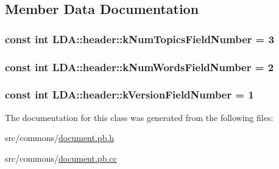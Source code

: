 \subsection{Member Data Documentation}
\hypertarget{class_l_d_a_1_1header_a3e4e67c2abbd89bf59dcb6a58a5e93f4}{
\subsubsection[{kNumTopicsFieldNumber}]{\setlength{\rightskip}{0pt plus 5cm}const int {\bf LDA::header::kNumTopicsFieldNumber} = 3}}
\label{class_l_d_a_1_1header_a3e4e67c2abbd89bf59dcb6a58a5e93f4}
\hypertarget{class_l_d_a_1_1header_a947277b31db705577059029c9ae305c5}{
\subsubsection[{kNumWordsFieldNumber}]{\setlength{\rightskip}{0pt plus 5cm}const int {\bf LDA::header::kNumWordsFieldNumber} = 2}}
\label{class_l_d_a_1_1header_a947277b31db705577059029c9ae305c5}
\hypertarget{class_l_d_a_1_1header_ad9b0bbfc947d7b6dc37a89ab69f9ff5f}{
\subsubsection[{kVersionFieldNumber}]{\setlength{\rightskip}{0pt plus 5cm}const int {\bf LDA::header::kVersionFieldNumber} = 1}}
\label{class_l_d_a_1_1header_ad9b0bbfc947d7b6dc37a89ab69f9ff5f}


The documentation for this class was generated from the following files:\begin{DoxyCompactItemize}
\item 
src/commons/\hyperlink{document_8pb_8h}{document.pb.h}\item 
src/commons/\hyperlink{document_8pb_8cc}{document.pb.cc}\end{DoxyCompactItemize}
